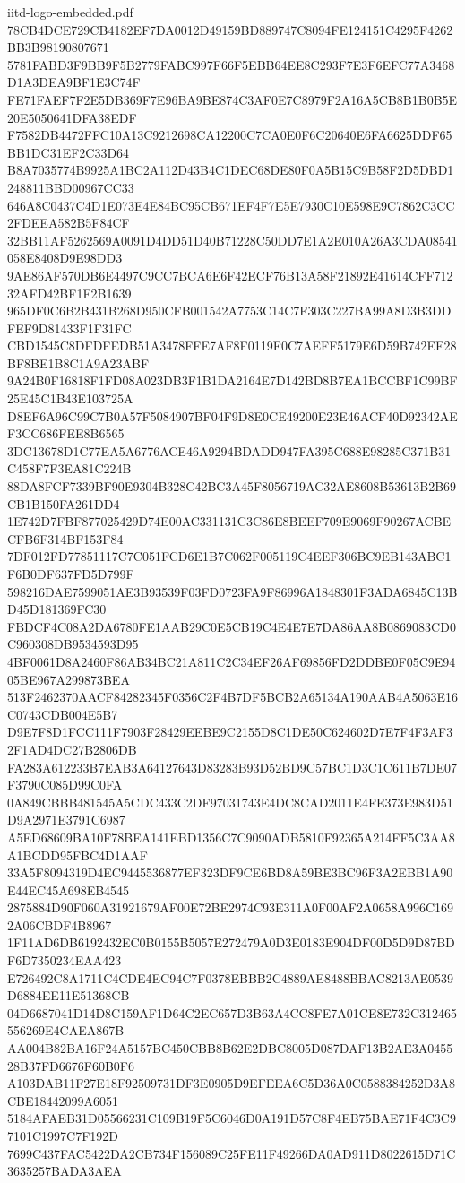 \begin{filecontents*}[overwrite]{iitd-logo-embedded.pdf}
78CB4DCE729CB4182EF7DA0012D49159BD889747C8094FE124151C4295F4262BB3B98190807671
5781FABD3F9BB9F5B2779FABC997F66F5EBB64EE8C293F7E3F6EFC77A3468D1A3DEA9BF1E3C74F
FE71FAEF7F2E5DB369F7E96BA9BE874C3AF0E7C8979F2A16A5CB8B1B0B5E20E5050641DFA38EDF
F7582DB4472FFC10A13C9212698CA12200C7CA0E0F6C20640E6FA6625DDF65BB1DC31EF2C33D64
B8A7035774B9925A1BC2A112D43B4C1DEC68DE80F0A5B15C9B58F2D5DBD1248811BBD00967CC33
646A8C0437C4D1E073E4E84BC95CB671EF4F7E5E7930C10E598E9C7862C3CC2FDEEA582B5F84CF
32BB11AF5262569A0091D4DD51D40B71228C50DD7E1A2E010A26A3CDA08541058E8408D9E98DD3
9AE86AF570DB6E4497C9CC7BCA6E6F42ECF76B13A58F21892E41614CFF71232AFD42BF1F2B1639
965DF0C6B2B431B268D950CFB001542A7753C14C7F303C227BA99A8D3B3DDFEF9D81433F1F31FC
CBD1545C8DFDFEDB51A3478FFE7AF8F0119F0C7AEFF5179E6D59B742EE28BF8BE1B8C1A9A23ABF
9A24B0F16818F1FD08A023DB3F1B1DA2164E7D142BD8B7EA1BCCBF1C99BF25E45C1B43E103725A
D8EF6A96C99C7B0A57F5084907BF04F9D8E0CE49200E23E46ACF40D92342AEF3CC686FEE8B6565
3DC13678D1C77EA5A6776ACE46A9294BDADD947FA395C688E98285C371B31C458F7F3EA81C224B
88DA8FCF7339BF90E9304B328C42BC3A45F8056719AC32AE8608B53613B2B69CB1B150FA261DD4
1E742D7FBF877025429D74E00AC331131C3C86E8BEEF709E9069F90267ACBECFB6F314BF153F84
7DF012FD77851117C7C051FCD6E1B7C062F005119C4EEF306BC9EB143ABC1F6B0DF637FD5D799F
598216DAE7599051AE3B93539F03FD0723FA9F86996A1848301F3ADA6845C13BD45D181369FC30
FBDCF4C08A2DA6780FE1AAB29C0E5CB19C4E4E7E7DA86AA8B0869083CD0C960308DB9534593D95
4BF0061D8A2460F86AB34BC21A811C2C34EF26AF69856FD2DDBE0F05C9E9405BE967A299873BEA
513F2462370AACF84282345F0356C2F4B7DF5BCB2A65134A190AAB4A5063E16C0743CDB004E5B7
D9E7F8D1FCC111F7903F28429EEBE9C2155D8C1DE50C624602D7E7F4F3AF32F1AD4DC27B2806DB
FA283A612233B7EAB3A64127643D83283B93D52BD9C57BC1D3C1C611B7DE07F3790C085D99C0FA
0A849CBBB481545A5CDC433C2DF97031743E4DC8CAD2011E4FE373E983D51D9A2971E3791C6987
A5ED68609BA10F78BEA141EBD1356C7C9090ADB5810F92365A214FF5C3AA8A1BCDD95FBC4D1AAF
33A5F8094319D4EC9445536877EF323DF9CE6BD8A59BE3BC96F3A2EBB1A90E44EC45A698EB4545
2875884D90F060A31921679AF00E72BE2974C93E311A0F00AF2A0658A996C1692A06CBDF4B8967
1F11AD6DB6192432EC0B0155B5057E272479A0D3E0183E904DF00D5D9D87BDF6D7350234EAA423
E726492C8A1711C4CDE4EC94C7F0378EBBB2C4889AE8488BBAC8213AE0539D6884EE11E51368CB
04D6687041D14D8C159AF1D64C2EC657D3B63A4CC8FE7A01CE8E732C312465556269E4CAEA867B
AA004B82BA16F24A5157BC450CBB8B62E2DBC8005D087DAF13B2AE3A045528B37FD6676F60B0F6
A103DAB11F27E18F92509731DF3E0905D9EFEEA6C5D36A0C0588384252D3A8CBE18442099A6051
5184AFAEB31D05566231C109B19F5C6046D0A191D57C8F4EB75BAE71F4C3C97101C1997C7F192D
7699C437FAC5422DA2CB734F156089C25FE11F49266DA0AD911D8022615D71C3635257BADA3AEA

\end{filecontents*}
